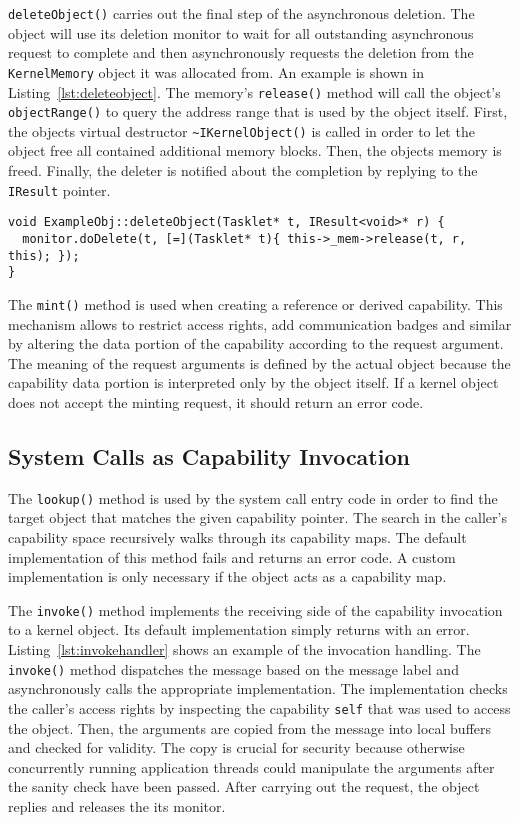 \texttt{deleteObject()} carries out the final step of the asynchronous
deletion. The object will use its deletion monitor to wait for all
outstanding asynchronous request to complete and then asynchronously
requests the deletion from the \texttt{KernelMemory} object it was
allocated from. An example is shown in
Listing~\ref{lst:deleteobject}. The memory's \texttt{release()} method
will call the object's \texttt{objectRange()} to query the address
range that is used by the object itself. First, the objects virtual
destructor \texttt{\textasciitilde IKernelObject()} is called in order to let the
object free all contained additional memory blocks. Then, the objects
memory is freed. Finally, the deleter is notified about the completion
by replying to the \texttt{IResult} pointer.

\begin{lstlisting}[float, label=lst:deleteobject, caption=Example handler for asynchronous object deletion.]
void ExampleObj::deleteObject(Tasklet* t, IResult<void>* r) {
  monitor.doDelete(t, [=](Tasklet* t){ this->_mem->release(t, r, this); });
}
\end{lstlisting}

The \texttt{mint()} method is used when creating a reference or derived capability. This mechanism allows to restrict access rights, add communication badges and similar by altering the data portion of the capability according to the request argument. The meaning of the request arguments is defined by the actual object because the capability data portion is interpreted only by the object itself. If a kernel object does not accept the minting request, it should return an error code.

\subsection{System Calls as Capability Invocation}

The \texttt{lookup()} method is used by the system call entry code in
order to find the target object that matches the given capability
pointer. The search in the caller's capability space recursively walks
through its capability maps. The default implementation of this method
fails and returns an error code. A custom implementation is only
necessary if the object acts as a capability map.

The \texttt{invoke()} method implements the receiving side of the
capability invocation to a kernel object. Its default implementation
simply returns with an error. Listing~\ref{lst:invokehandler} shows an
example of the invocation handling. The \texttt{invoke()} method
dispatches the message based on the message label and asynchronously
calls the appropriate implementation. The implementation checks the
caller's access rights by inspecting the capability \texttt{self} that
was used to access the object. Then, the arguments are copied from the
message into local buffers and checked for validity. The copy is
crucial for security because otherwise concurrently running
application threads could manipulate the arguments after the sanity
check have been passed. After carrying out the request, the object
replies and releases the its monitor.


